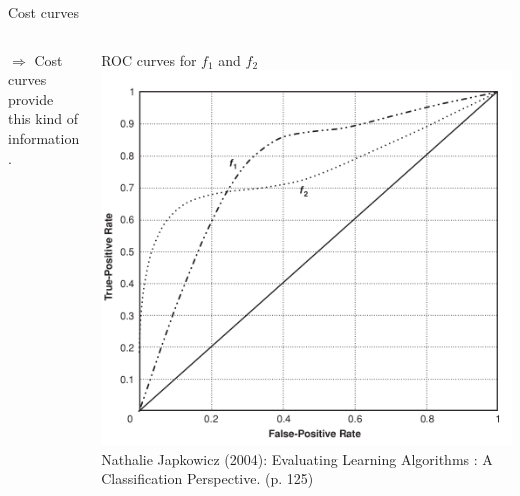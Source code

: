 \begin{vbframe}{Cost curves}
\begin{columns}
\begin{column}{0.6\textwidth}
  $\Rightarrow$ Cost curves provide this kind of information.
\end{column}
\begin{column}{0.39\textwidth}
    \centering
    \tiny ROC curves for $f_1$ and $f_2$
    \includegraphics[width=\textwidth]{figure_man/cost-curves-1.png}
    {\tiny Nathalie Japkowicz (2004): Evaluating Learning Algorithms : A
    Classification Perspective. (p. 125)}
\end{column}
\end{columns}


\end{vbframe}




